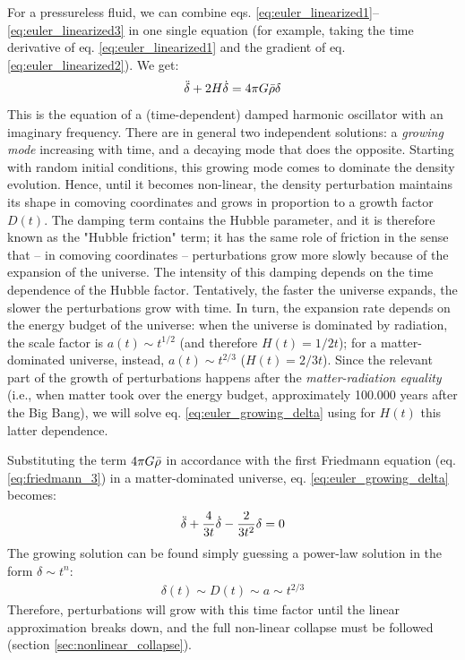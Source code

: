  For a pressureless fluid, we can combine eqs. \ref{eq:euler_linearized1}--\ref{eq:euler_linearized3} in one single equation (for example, taking the time derivative of eq. \ref{eq:euler_linearized1} and the gradient of eq. \ref{eq:euler_linearized2}). We get:
 \begin{align}
    \Ddot{\delta} + 2H\Dot{\delta} = 4\pi G \Bar{\rho}\delta \label{eq:euler_growing_delta}
 \end{align}
 This is the equation of a (time-dependent) damped harmonic oscillator with an imaginary frequency. There are in general two independent solutions: a \textit{growing mode} increasing with time, and a decaying mode that does the opposite. Starting with random initial conditions, this growing mode comes to dominate the density evolution. Hence, until it becomes non-linear, the density perturbation maintains its shape in comoving coordinates and grows in proportion to a growth factor $D(t)$.
 The damping term contains the Hubble parameter, and it is therefore known as the "Hubble friction" term; it has the same role of friction in the sense that -- in comoving coordinates -- perturbations grow more slowly because of the expansion of the universe. The intensity of this damping depends on the time dependence of the Hubble factor. Tentatively, the faster the universe expands, the slower the perturbations grow with time. In turn, the expansion rate depends on the energy budget of the universe: when the universe is dominated by radiation, the scale factor is $a(t)\sim t^{1/2}$ (and therefore $H(t)=1/2t$); for a matter-dominated universe, instead, $a(t)\sim t^{2/3}$ ($H(t)=2/3t$). Since the relevant part of the growth of perturbations happens after the \textit{matter-radiation equality} (i.e., when matter took over the energy budget, approximately 100.000 years after the Big Bang), we will solve eq. \ref{eq:euler_growing_delta} using for $H(t)$ this latter dependence. 
 
 Substituting the term $4\pi G\Bar{\rho}$ in accordance with the first Friedmann equation (eq. \ref{eq:friedmann_3}) in a matter-dominated universe, eq. \ref{eq:euler_growing_delta} becomes:
 \begin{align}
    \Ddot{\delta} + \frac{4}{3t}\Dot{\delta} - \frac{2}{3t^2} \delta = 0
 \end{align}
 The growing solution can be found simply guessing a power-law solution in the form $\delta\sim t^n$:
 \begin{align}
    \delta(t) \sim D(t) \sim a \sim t^{2/3} \label{eq:growth_factor}
 \end{align}
 Therefore, perturbations will grow with this time factor until the linear approximation breaks down, and the full non-linear collapse must be followed (section \ref{sec:nonlinear_collapse}). 
 
